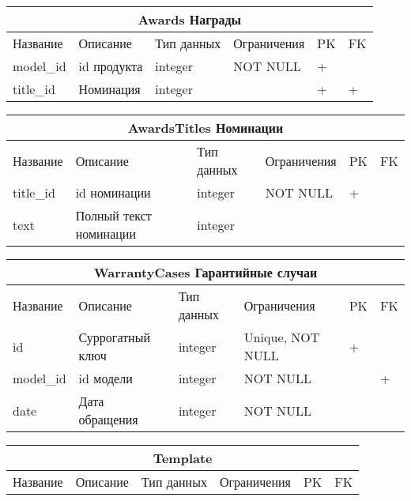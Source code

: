 \documentclass{article}
\begin{document}
\begin{tabular}{ |p{3.5cm}|p{3cm}|p{3cm}|p{3cm}|p{2cm}|p{2cm}| }
\hline
\multicolumn{6}{|c|}{Awards Награды} \\
\hline
Название & Описание & Тип данных & Ограничения & PK & FK\\
\hline
model\_id              &   %
id продукта            &   %
integer                &   %
NOT NULL               &   %
 +                     &   %
                       \\  %
\hline
title\_id              &   %
Номинация              &   %
integer                &   %
                       &   %
 +                     &   %
 +                     \\  %
\hline
\end{tabular}

\begin{tabular}{ |p{3.5cm}|p{3cm}|p{3cm}|p{3cm}|p{2cm}|p{2cm}| }
\hline
\multicolumn{6}{|c|}{AwardsTitles Номинации} \\
\hline
Название & Описание & Тип данных & Ограничения & PK & FK\\
\hline
title\_id              &   %
id номинации           &   %
integer                &   %
NOT NULL               &   %
 +                     &   %
                       \\  %
\hline
text                   &   %
Полный текст номинации &   %
integer                &   %
                       &   %
                       &   %
                       \\  %
\hline
\end{tabular}

\begin{tabular}{ |p{3.5cm}|p{3cm}|p{3cm}|p{3cm}|p{2cm}|p{2cm}| }
\hline
\multicolumn{6}{|c|}{WarrantyCases Гарантийные случаи} \\
\hline
Название & Описание & Тип данных & Ограничения & PK & FK\\
\hline
id                     &   %
Суррогатный ключ       &   %
integer                &   %
Unique, NOT NULL       &   %
 +                     &   %
                       \\  %
\hline
model\_id              &   %
id модели              &   %
integer                &   %
NOT NULL               &   %
                       &   %
 +                     \\  %
\hline
date                   &   %
Дата обращения         &   %
integer                &   %
NOT NULL               &   %
                       &   %
                       \\  %
\hline
\end{tabular}

\newpage

\begin{tabular}{ |p{3.5cm}|p{3cm}|p{3cm}|p{3cm}|p{2cm}|p{2cm}| }
\hline
\multicolumn{6}{|c|}{Template} \\
\hline
Название & Описание & Тип данных & Ограничения & PK & FK\\
\hline
\end{tabular}
\end{document}
